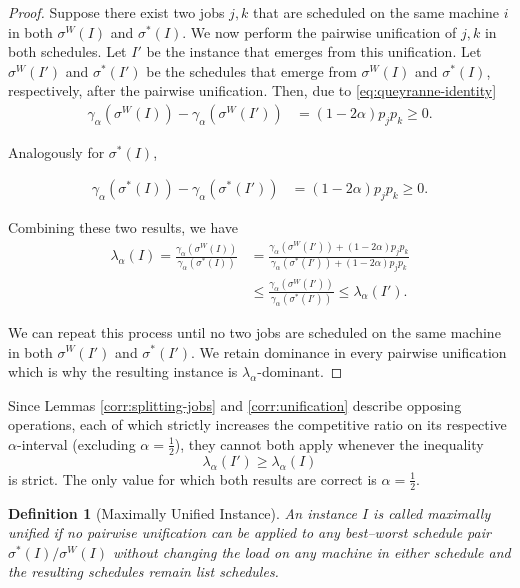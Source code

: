 \documentclass[%
english, titlepage=false %
]{./tum-templates/book/tumbook}
\newtheorem{definition}{Definition}
\begin{document}
\begin{proof}[Proof]
    Suppose there exist two jobs $j,k$ that are scheduled on the same machine $i$ in both $\sigma^{W}(I)$ and $\sigma^{*}(I)$.
    We now perform the pairwise unification of $j,k$ in both schedules. Let $I'$ be the instance that emerges from this unification.
    Let $\sigma^{W}(I')$ and $\sigma^{*}(I')$ be the schedules that emerge from $\sigma^{W}(I)$ and $\sigma^{*}(I)$, respectively, after the pairwise unification.
    Then, due to \eqref{eq:queyranne-identity}
    \begin{align*}
        \gamma_{\alpha}(\sigma^{W}(I)) - \gamma_{\alpha}(\sigma^{W}(I'))
        &= (1-2\alpha)p_jp_k \ge 0.
    \end{align*}

    Analogously for $\sigma^{*}(I)$,

    \begin{align*}
        \gamma_{\alpha}(\sigma^{*}(I)) - \gamma_{\alpha}(\sigma^{*}(I'))
        &= (1-2\alpha)p_jp_k \ge 0.
    \end{align*}

    Combining these two results, we have
    \begin{align*}
        \lambda_{\alpha}(I) = \frac{\gamma_{\alpha}(\sigma^{W}(I))}{\gamma_{\alpha}(\sigma^{*}(I))}
        &= \frac{\gamma_{\alpha}(\sigma^{W}(I')) + (1-2\alpha)p_jp_k}{\gamma_{\alpha}(\sigma^{*}(I'))+ (1-2\alpha)p_jp_k } \\
        &\le \frac{\gamma_{\alpha}(\sigma^{W}(I'))}{\gamma_{\alpha}(\sigma^{*}(I'))}
        \le \lambda_{\alpha}(I').
    \end{align*}

    We can repeat this process until no two jobs are scheduled on the same machine in both $\sigma^{W}(I')$ and $\sigma^{*}(I')$.
    We retain dominance in every pairwise unification which is why the resulting instance is $\lambda_{\alpha}$-dominant.
\end{proof}
Since Lemmas \ref{corr:splitting-jobs} and \ref{corr:unification} describe opposing operations, 
each of which strictly increases the competitive ratio on its respective \(\alpha\)-interval (excluding $\alpha=\frac12$), 
they cannot both apply whenever the inequality  
\[
\lambda_{\alpha}(I') \geq \lambda_{\alpha}(I)
\]is strict.
The only value for which both results are correct is \(\alpha=\frac12\).

\begin{definition}[Maximally Unified Instance]\label{def: maximally unified}
    An instance \(I\) is called \emph{maximally unified} 
    if no pairwise unification can be applied to any best–worst schedule pair $\sigma^*(I)/\sigma^W(I)$ without changing 
    the load on any machine in either schedule and the resulting schedules remain list schedules.
\end{definition}
\end{document}
